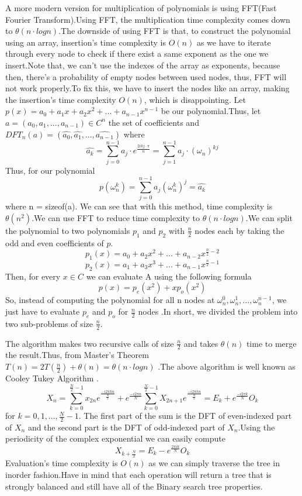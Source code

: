 \documentclass[journal,article,submit,moreauthors,algorithms]{Definitions/mdpi}
\begin{document}
A more modern version for multiplication of polynomials is using FFT(Fast Fourier Transform).Using FFT, the multiplication time complexity comes down to $\theta(n \cdot logn)$.The downside of using FFT is that, to construct the polynomial using an array, insertion's time complexity is $O(n)$ as we have to iterate through every node to check if there exist a same exponent as the one we insert.Note that, we can't use the indexes of the array as exponents, because then, there's a probability of empty nodes between used nodes, thus, FFT will not work properly.To fix this, we have to insert the nodes like an array, making the insertion's time complexity $O(n)$, which is disappointing.
Let $p(x) = a_0 + a_1x + a_2x^2 + ... + a_{n-1}x^{n-1}$ be our polynomial.Thus, let $a = (a_0, a_1, ..., a_{n-1}) \in C^n$ the set of coefficients and $DFT_n(a) = (\hat{a_0}, \hat{a_1}, ..., \hat{a_{n-1}})$ where \[\hat{a_k} = \sum_{j=0}^{n-1}a_j \cdot e^{\frac{2ikj \cdot \pi}{n}} = \sum_{j = 1}^{n - 1}a_j \cdot (\omega_n)^{kj}\]
Thus, for our polynomial \[p(\omega_n^k) = \sum_{j=0}^{n-1} a_j(\omega_n^k)^j = \hat{a_k}\] where n = sizeof(a).
We can see that with this method, time complexity is $\theta(n^2)$.We can use FFT to reduce time complexity to $\theta(n \cdot logn)$.We can split the polynomial to two polynomials $p_1$ and $p_2$ with $\frac{n}{2}$ nodes each by taking the odd and even coefficients of $p$.\[p_1(x) = a_0 + a_2x^2 + ... + a_{n-2}x^{\frac{n}{2}-2}\] \[p_2(x) = a_1 + a_3x^3 + ... + a_{n-1}x^{\frac{n}{2} - 1}\]
Then, for every $x \in C$ we can evaluate A using the following formula \[p(x) = p_e(x^2) + xp_o(x^2)\]
So, instead of computing the polynomial for all n nodes at $\omega^0_n, \omega^1_n, ..., \omega^{n-1}_n$, we just have to evaluate $p_e$ and $p_o$ for $\frac{n}{2}$ nodes \cite{FFT Rec}.In short, we divided the problem into two sub-problems of size $\frac{n}{2}$.

The algorithm makes two recursive calls of size $\frac{n}{2}$ and takes $\theta(n)$ time to merge the result.Thus, from Master's Theorem $T(n) = 2T(\frac{n}{2}) + \theta(n) = \theta(n \cdot logn)$ \cite{Masters Theorem}.The above algorithm is well known as Cooley Tukey Algorithm \cite{Cooley Tukey,Cooley Tukey 2}. \[X_n = \sum_{k = 0}^{\frac{N}{2} - 1} x_{2n}e^{\frac{-i 2 \pi k n}{\frac{N}{2}}} + e^{\frac{-i 2 \pi n}{N}}\sum_{k=0}^{\frac{N}{2} - 1} X_{2n + 1} e^{\frac{-i 2 \pi k n}{\frac{N}{2}}} = E_k + e^{\frac{-i 2 \pi k}{N}} O_k\] for $k = 0,1,...,\frac{N}{2} - 1$.
The first part of the sum is the DFT of even-indexed part of $X_n$ and the second part is the DFT of odd-indexed part of $X_n$.Using the periodicity of the complex exponential we can easily compute \[X_{k + \frac{N}{2}} = E_k - e^{\frac{2 \pi i k}{N}} O_k\]
\medbreak
Evaluation's time complexity is $O(n)$ as we can simply traverse the tree in inorder fashion.Have in mind that each operation will return a tree that is strongly balanced and still have all of the Binary search tree properties.

\end{document}

